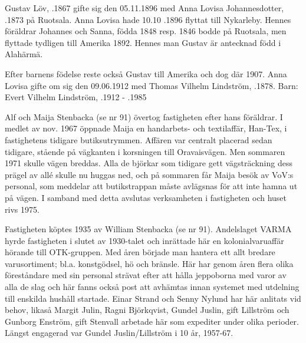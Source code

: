 
Gustav Löv, .1867 gifte sig den 05.11.1896 med Anna Lovisa Johannesdotter, .1873 på Ruotsala. Anna Lovisa hade 10.10 .1896 flyttat till Nykarleby. Hennes föräldrar Johannes och Sanna, födda 1848 resp. 1846 bodde på Ruotsala, men flyttade tydligen till Amerika 1892. Hennes man Gustav är antecknad född i Alahärmä.

\begin{jhchildren}
  \item {}
  \item {}
  \item {}
  \item {}
\end{jhchildren}

Efter barnens födelse reste också Gustav till Amerika och dog där 1907. Anna Lovisa gifte om sig den 09.06.1912 med Thomas Vilhelm Lindström, .1878.
Barn: Evert Vilhelm Lindström, .1912 - .1985





Alf och Maija Stenbacka (se nr 91) övertog fastigheten efter hans föräldrar. I medlet av nov. 1967 öppnade Maija en handarbets- och textilaffär, Han-Tex, i fastighetens tidigare butiksutrymmen. Affären var centralt placerad sedan tidigare, stående på vägkanten i korsningen till Oravaisvägen. Men sommaren 1971 skulle vägen breddas. Alla de björkar som tidigare gett vägsträckning dess prägel av allé skulle nu huggas ned, och på sommaren får Maija besök av VoV:s personal, som meddelar att butikstrappan måste avlägsnas för att inte hamna ut på vägen. I samband med detta avslutas verksamheten i fastigheten och huset rivs 1975.



Fastigheten köptes 1935 av William Stenbacka (se nr 91). Andelslaget VARMA hyrde fastigheten i slutet av 1930-talet och inrättade här en kolonialvaruaffär hörande till OTK-gruppen. Med åren började man hantera ett allt bredare varusortiment; bl.a. konstgödsel, hö och bränsle. Här har genom åren flera  olika föreståndare med sin personal strävat efter att hålla jeppoborna med varor av alla de slag och här fanns också post att avhämtas innan systemet med utdelning till enskilda hushåll startade. Einar Strand och Senny Nylund har här anlitats vid behov, likaså Margit Julin, Ragni Björkqvist, Gundel Juslin, gift Lillström och Gunborg Enström, gift Stenvall arbetade här som expediter under olika perioder. Längst engagerad var Gundel Juslin/Lillström i 10 år, 1957-67.

